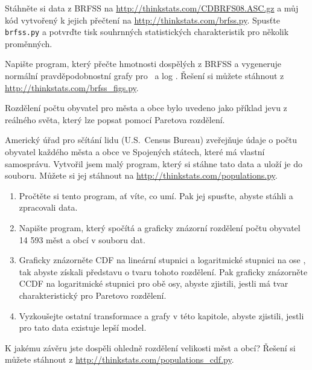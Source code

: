 \documentclass[12pt]{book}
\begin{document}
\begin{exercise}
Stáhněte si data z BRFSS na
\url{http://thinkstats.com/CDBRFS08.ASC.gz} a můj kód vytvořený k jejich přečtení na
\url{http://thinkstats.com/brfss.py}.  Spusťte {\tt brfss.py} a potvrďte tisk souhrnných statistických charakteristik pro několik proměnných.

Napište program, který přečte hmotnosti dospělých z BRFSS a vygeneruje normální pravděpodobnostní grafy pro
\w~a log \w.  Řešení si můžete stáhnout z
\url{http://thinkstats.com/brfss_figs.py}.

\end{exercise}

\begin{exercise}
Rozdělení počtu obyvatel pro města a obce bylo uvedeno jako příklad jevu z reálného světa, který lze popsat pomocí Paretova rozdělení.

Americký úřad pro sčítání lidu (U.S.~Census Bureau) zveřejňuje údaje o počtu obyvatel každého města a obce ve Spojených státech, které má vlastní samosprávu. Vytvořil jsem malý program, který si stáhne tato data a uloží je do souboru. Můžete si jej stáhnout na
 \url{http://thinkstats.com/populations.py}.

\begin{enumerate}

\item Pročtěte si tento program, ať víte, co umí. Pak jej spusťte, abyste stáhli a zpracovali data.

\item Napište program, který spočítá a graficky znázorní rozdělení počtu obyvatel 14 593 měst a obcí v souboru dat.

\item Graficky znázorněte CDF na lineární stupnici a logaritmické stupnici na ose \x, tak abyste získali představu o tvaru tohoto rozdělení. Pak graficky znázorněte CCDF na logaritmické stupnici pro obě osy, abyste zjistili, jestli má tvar charakteristický pro Paretovo rozdělení.

\item Vyzkoušejte ostatní transformace a grafy v této kapitole, abyste zjistili, jestli pro tato data existuje lepší model.

\end{enumerate}

K jakému závěru jste dospěli ohledně rozdělení velikosti měst a obcí? Řešení si můžete stáhnout z
\url{http://thinkstats.com/populations_cdf.py}.

\end{exercise}
\end{document}
